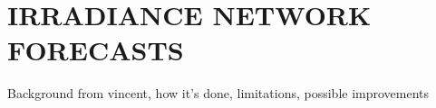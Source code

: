 \chapter{IRRADIANCE NETWORK FORECASTS}
\label{chap:network}

Background from vincent, how it's done, limitations, possible improvements

